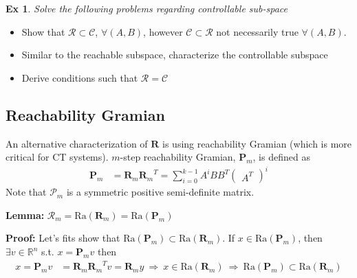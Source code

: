 \documentclass[twoside]{article}
\newtheorem{exmp}[theorem]{Ex}
\begin{document}
\begin{exmp}
Solve the following problems regarding controllable sub-space
\end{exmp}
\begin{itemize}
    \item Show that $\mathcal{R} \subset \mathcal{C}$, $\forall (A,B)$, however $\mathcal{C} \subset \mathcal{R}$ not necessarily true $\forall (A,B)$.
    \item Similar to the reachable subspace, characterize the controllable subspace
    \item Derive conditions such that $\mathcal{R} = \mathcal{C}$
\end{itemize}

\subsection{Reachability Gramian}

An alternative characterization of $\mathbf{R}$ is using reachability Gramian (which is more critical for CT systems).
$m$-step reachability Gramian, $\mathbf{P}_m$, is defined as
%
\begin{align}
 \mathbf{P}_m &= \mathbf{R}_m {\mathbf{R}_m}^T =\sum\limits_{i=0}^{k-1} A^i B B^T \begin{pmatrix} A^T \end{pmatrix}^i
\end{align}
%
Note that $\mathcal{P}_m$ is a symmetric positive semi-definite matrix.

\textbf{Lemma:} $\mathcal{R}_m = \mathrm{Ra}( \mathbf{R}_m ) = \mathrm{Ra} ( \mathbf{P}_m )$

\textbf{Proof:} Let's fits show that $\mathrm{Ra}( \mathbf{P}_m ) \subset \mathrm{Ra}( \mathbf{R}_m )$. 
If $x \in \mathrm{Ra} (\mathbf{P}_m)$, then $\exists v \in \mathbb{R}^n$ s.t. $x = \mathbf{P}_m v$ then
%
\begin{align*}
 x = \mathbf{P}_m v &= \mathbf{R}_m {\mathbf{R}_m}^T v = \mathbf{R}_m y \ \Rightarrow \ x \in \mathrm{Ra}( \mathbf{R}_m ) \ \Rightarrow \ \mathrm{Ra}( \mathbf{P}_m ) \subset \mathrm{Ra}( \mathbf{R}_m )
\end{align*}
\end{document}
